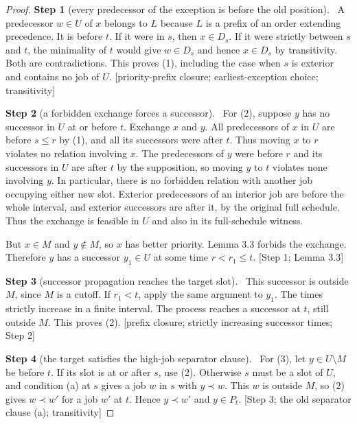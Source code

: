 \documentclass[11pt,a4paper]{article}
\theoremstyle{plain}
\theoremstyle{definition}
\newcommand{\step}[2]{\par\smallskip\noindent\textbf{Step #1} (#2).\ \ignorespaces}
\newcommand{\by}[1]{{\small[#1]}}
\begin{document}
\begin{proof}
\step{1}{every predecessor of the exception is before the old position}
A predecessor \(w\in U\) of \(x\) belongs to \(L\) because \(L\) is a prefix of an order extending precedence. It is before \(t\). If it were in \(s\), then \(x\in D_s\). If it were strictly between \(s\) and \(t\), the minimality of \(t\) would give \(w\in D_s\) and hence \(x\in D_s\) by transitivity. Both are contradictions. This proves (1), including the case when \(s\) is exterior and contains no job of \(U\).
\by{priority-prefix closure; earliest-exception choice; transitivity}

\step{2}{a forbidden exchange forces a successor}
For (2), suppose \(y\) has no successor in \(U\) at or before \(t\). Exchange \(x\) and \(y\). All predecessors of \(x\) in \(U\) are before \(s\leq r\) by (1), and all its successors were after \(t\). Thus moving \(x\) to \(r\) violates no relation involving \(x\). The predecessors of \(y\) were before \(r\) and its successors in \(U\) are after \(t\) by the supposition, so moving \(y\) to \(t\) violates none involving \(y\). In particular, there is no forbidden relation with another job occupying either new slot. Exterior predecessors of an interior job are before the whole interval, and exterior successors are after it, by the original full schedule. Thus the exchange is feasible in \(U\) and also in its full-schedule witness.

But \(x\in M\) and \(y\notin M\), so \(x\) has better priority. Lemma 3.3 forbids the exchange. Therefore \(y\) has a successor \(y_1\in U\) at some time \(r<r_1\leq t\).
\by{Step 1; Lemma 3.3}

\step{3}{successor propagation reaches the target slot}
This successor is outside \(M\), since \(M\) is a cutoff. If \(r_1<t\), apply the same argument to \(y_1\). The times strictly increase in a finite interval. The process reaches a successor at \(t\), still outside \(M\). This proves (2).
\by{prefix closure; strictly increasing successor times; Step 2}

\step{4}{the target satisfies the high-job separator clause}
For (3), let \(y\in U\setminus M\) be before \(t\). If its slot is at or after \(s\), use (2). Otherwise \(s\) must be a slot of \(U\), and condition (a) at \(s\) gives a job \(w\) in \(s\) with \(y\prec w\). This \(w\) is outside \(M\), so (2) gives \(w\prec w'\) for a job \(w'\) at \(t\). Hence \(y\prec w'\) and \(y\in P_t\).
\by{Step 3; the old separator clause (a); transitivity}
\end{proof}
\end{document}
